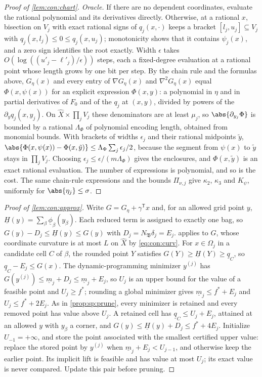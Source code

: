 \begin{proof}[Proof of \cref{lem:con:chart}]
\emph{Oracle.} If there are no dependent coordinates, evaluate the rational
polynomial and its derivatives directly. Otherwise, at a rational $x$,
bisection on $V_j$ with exact rational
signs of $q_j(x,\cdot)$ keeps a bracket $[l_j,u_j]\subseteq V_j$ with
$q_j(x,l_j)\le0\le q_j(x,u_j)$; monotonicity shows that it contains
$\psi_j(x)$, and a zero sign identifies the root exactly. Width $\epsilon$
takes $O(\log((u'_j-\ell'_j)/\epsilon))$ steps, each a fixed-degree
evaluation at a rational point whose length grows by one bit per step. By
the chain rule and the formulas above, $G_\eta(x)$ and every entry of
$\nabla G_\eta(x)$ and $\nabla^2G_\eta(x)$ equal $\Phi(x,\psi(x))$ for an
explicit expression $\Phi(x,y)$: a polynomial in $\eta$ and in partial
derivatives of $F_0$ and of the $q_j$ at $(x,y)$, divided by powers of the
$\partial_yq_j(x,y_j)$. On $\widehat X\times\prod_jV_j$ these denominators
are at least $\mu_j$, so $\abs{\partial_{y_j}\Phi}$ is bounded by a rational
$\Lambda_\Phi$ of polynomial encoding length, obtained from monomial bounds.
With brackets of widths $\epsilon_j$ and their rational midpoints $\tilde y$,
$\abs{\Phi(x,\psi(x))-\Phi(x,\tilde y)}\le\Lambda_\Phi\sum_j\epsilon_j/2$,
because the segment from $\psi(x)$ to $\tilde y$ stays in $\prod_jV_j$.
Choosing $\epsilon_j\le\epsilon/(m\Lambda_\Phi)$ gives the enclosures, and
$\Phi(x,\tilde y)$ is an exact rational evaluation. The number of
expressions is polynomial, and so is the cost. The same chain-rule
expressions and the bounds $\Pi_{\nu,j}$ give $\kappa_2$, $\kappa_3$ and
$K_\psi$, uniformly for $\abs{\eta_j}\le\sigma$.
\end{proof}

\begin{proof}[Proof of \cref{lem:con:approx}]
Write $G=G_\eta+\gamma^{\mathsf T}x$ and, for an allowed grid point $y$,
$\underline H(y)=\sum_\beta\underline\phi_\beta(y_\beta)$. Each reduced term
is assigned to exactly one bag, so
$G(y)-D_j\le\underline H(y)\le G(y)$ with $D_j=N_{\mathfrak B}\delta_j=E_j$.
 applies to $G$, whose coordinate curvature is at most $L$
on $\widehat X$ by \eqref{eq:con:curv}. For $x\in\Omega_j$ in a candidate cell
$C$ of $\beta$, the rounded point $Y$ satisfies
$G(Y)\ge\underline H(Y)\ge\underline q_C$, so $\underline q_C-E_j\le G(x)$.
The dynamic-programming minimizer $y^{(j)}$ has
$G(y^{(j)})\le\underline m_j+D_j\le\underline m_j+E_j$, so $U_j$ is an upper
bound for the value of a feasible point and $U_j\ge f^*$; rounding a global
minimizer gives $\underline m_j\le f^*+E_j$ and $U_j\le f^*+2E_j$. As in
\cref{prop:sp:prune}, every minimizer is retained and every removed point has
value above $U_j$. A retained cell has $\underline q_C\le U_j+E_j$, attained at
an allowed $y$ with $y_\beta$ a corner, and
$G(y)\le\underline H(y)+D_j\le f^*+4E_j$. Initialize $U_{-1}=+\infty$, and
store the point associated with the smallest certified upper value:
replace the stored point by $y^{(j)}$ when
$\underline m_j+E_j<U_{j-1}$, and otherwise keep the earlier point.
Its implicit lift is feasible and has value at most $U_j$; its exact
value is never compared. Update this pair before pruning.
\end{proof}

